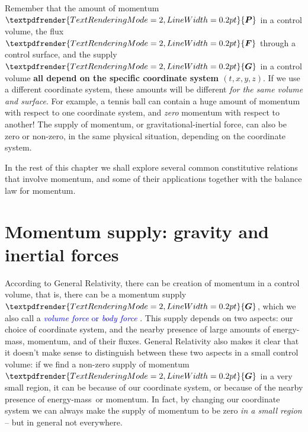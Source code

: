 \documentclass[a4paper,12pt,%
onecolumn,oneside,%
british%
]{memoir}
\providecommand{\href}[2]{#2}
\renewcommand*{\bm}[1]{\textpdfrender{TextRenderingMode=2,LineWidth=0.2pt}{\boldsymbol{#1}}}
\renewcommand*{\|}[1][]{\nonscript\:#1\vert\nonscript\:\mathopen{}}
\newcommand*{\sect}{\S}%
\newcommand*{\furl}[2]{\href{#1}{#2}\pagenote{\url{#1}}}
\renewcommand*{\autoref}[3][\sect\,\ref]{\textcolor{blue}{#3}
\raisebox{0.6ex}{\color{blue}\miniscule%
\faIcon{angle-right}%
\;#1{#2}\;p.\,\pageref{#2}}}
\newcommand*{\energym}{energy-mass}
\newcommand*{\yP}{\bm{P}}
\newcommand*{\yF}{\bm{F}}
\newcommand*{\yG}{\bm{G}}
\begin{document}
\begin{warning}
  Remember that the amount of momentum $\yP$ in a control volume, the flux $\yF$ through a control surface, and the supply $\yG$ in a control volume \textbf{all depend on the specific coordinate system $(t,x,y,z)$}. If we use a different coordinate system, these amounts will be different \emph{for the same volume and surface}. For example, a tennis ball can contain a huge amount of momentum with respect to one coordinate system, and \emph{zero} momentum with respect to another! The supply of momentum, or gravitational-inertial force, can also be zero or non-zero, in the same physical situation, depending on the coordinate system.
\end{warning}

\medskip

In the rest of this chapter we shall explore several common constitutive relations that involve momentum, and some of their applications together with the balance law for momentum.

\section{Momentum supply: gravity and inertial forces}
\label{sec:gravity}

According to General Relativity, there can be creation of momentum in a control volume, that is, there can be a momentum supply $\yG$, which we also call a \furl{this}{}\autoref{sec:contact_volume_forces}{\emph{volume force} or \emph{body force}}. This supply depends on two aspects: our choice of coordinate system, and the nearby presence of large amounts of \energym, momentum, and of their fluxes. General Relativity also makes it clear that it doesn't make sense to distinguish between these two aspects in a small control volume: if we find a non-zero supply of momentum $\yG$ in a very small region, it can be because of our coordinate system, or because of the nearby presence of \energym\ or momentum. In fact, by changing our coordinate system we can always make the supply of momentum to be zero \emph{in a small region} -- but in general not everywhere.
\end{document}
